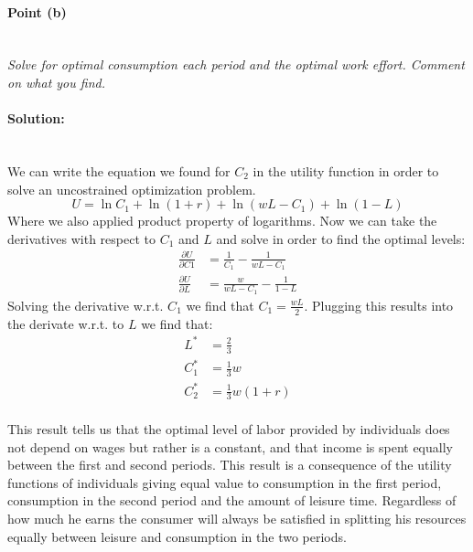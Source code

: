 \documentclass[12pt]{article}
\newcommand{\myparagraph}[1]{\paragraph{#1}\mbox{}\\}
\begin{document}
\myparagraph{Point (b)}
\textit{Solve for optimal consumption each period and the optimal work effort. Comment on what you find.}
\myparagraph{Solution:}
We can write the equation we found for $C_2$ in the utility function in order to solve an uncostrained optimization problem. 
\begin{equation}
U = \ln C_1 + \ln (1 + r) + \ln (wL - C_1) + \ln (1 - L)
\end{equation}
Where we also applied product property of logarithms.
Now we can take the derivatives with respect to $C_1$ and $L$ and solve in order to find the optimal
levels: 
\begin{align*}
\frac{\partial U}{\partial C1} &= \frac{1}{C_1} - \frac{1}{wL - C_1} \\
\frac{\partial U}{\partial L} &= \frac{w}{wL - C_1} - \frac{1}{1 - L}
\end{align*} 
Solving the derivative w.r.t. $C_1$ we find that $C_1 = \frac{wL}{2}$. Plugging this results into the derivate w.r.t. to $L$ we find that:\\
\begin{align*}
 L^{*} &= \frac{2}{3}\\
C_1^{*} &= \frac{1}{3}w \\
C_2^{*} &= \frac{1}{3}w(1+r)
\end{align*}\\
This result tells us that the optimal level of labor provided by individuals does not depend on wages but rather is a constant, and that income is spent equally between the first and second periods. This result is a consequence of the utility functions of individuals giving equal value to consumption in the first period, consumption in the second period and the amount of leisure time. Regardless of how much he earns the consumer will always be satisfied in splitting his resources equally between leisure and consumption in the two periods. 
\end{document}
